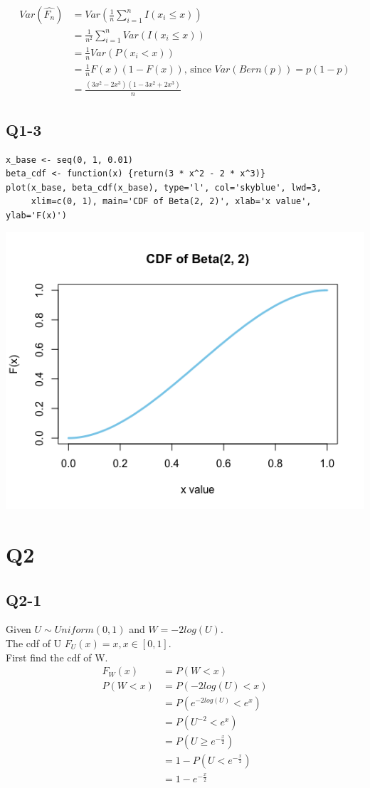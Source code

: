 \documentclass[12pt,letterpaper]{article}
\let\hat\widehat
\begin{document}
\begin{align*}
Var(\hat{F_n}) &= Var(\frac{1}{n} \sum_{i=1}^{n} I(x_i \leq x)) \\
&= \frac{1}{n^2} \sum_{i=1}^{n} Var(I(x_i \leq x)) \\
&= \frac{1}{n} Var(P(x_i < x)) \\
&= \frac{1}{n} F(x)(1 - F(x)) \text{, since } Var(Bern(p)) = p(1-p) \\
&= \frac{(3x^2 - 2x^3)(1 - 3x^2 + 2x^3)}{n}
\end{align*}

\pagebreak
\subsection*{Q1-3}
\begin{verbatim}
x_base <- seq(0, 1, 0.01)
beta_cdf <- function(x) {return(3 * x^2 - 2 * x^3)}
plot(x_base, beta_cdf(x_base), type='l', col='skyblue', lwd=3,
     xlim=c(0, 1), main='CDF of Beta(2, 2)', xlab='x value', ylab='F(x)')
\end{verbatim}

\includegraphics[width=150mm]{plot_beta.png}

\section*{Q2}
\subsection*{Q2-1}
Given $U \sim Uniform(0, 1) $ and $W = -2log(U)$. \\
\noindent The cdf of U $F_U(x) = x, x \in [0, 1]$. \\
\noindent First find the cdf of W.
\begin{align*}
F_W(x) &= P(W < x) \\
P(W < x) &= P(-2log(U) < x) \\
&= P(e^{-2log(U)} < e^x) \\
&= P(U^{-2} < e^x) \\
&= P(U \geq e^{- \frac{x}{2}}) \\
&= 1 - P(U < e^{- \frac{x}{2}}) \\
&= 1 - e^{- \frac{x}{2}}
\end{align*}
\end{document}
